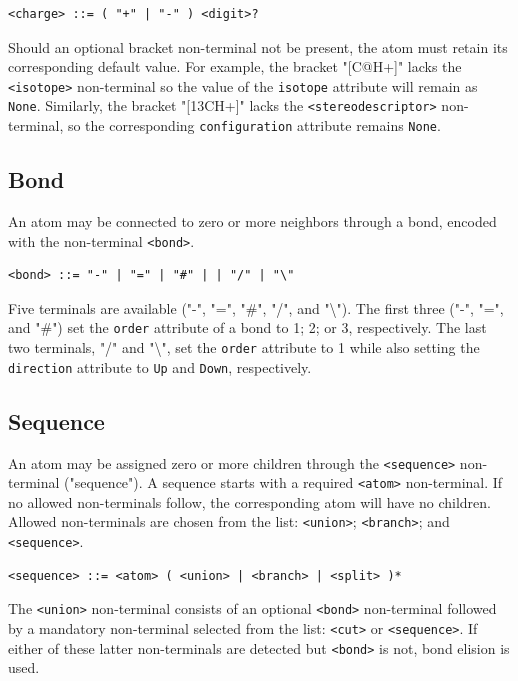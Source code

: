 \documentclass{article}
\def\ttt{\texttt}
\begin{document}
\begin{lstlisting}
<charge> ::= ( "+" | "-" ) <digit>?
\end{lstlisting}

Should an optional bracket non-terminal not be present, the atom must retain its corresponding default value. For example, the bracket "[C@H+]" lacks the \ttt{<isotope>} non-terminal so the value of the \ttt{isotope} attribute will remain as \ttt{None}. Similarly, the bracket "[13CH+]" lacks the \ttt{<stereodescriptor>} non-terminal, so the corresponding \ttt{configuration} attribute remains \ttt{None}.

\subsection*{Bond}

An atom may be connected to zero or more neighbors through a bond, encoded with the non-terminal \ttt{<bond>}.

\begin{lstlisting}
<bond> ::= "-" | "=" | "#" | | "/" | "\"
\end{lstlisting}

Five terminals are available ("-", "=", "\#", "/", and "\textbackslash"). The first three ("-", "=", and "\#") set the \ttt{order} attribute of a bond to 1; 2; or 3, respectively. The last two terminals, "/" and "\textbackslash", set the \ttt{order} attribute to 1 while also setting the \ttt{direction} attribute to \ttt{Up} and \ttt{Down}, respectively.

\subsection*{Sequence}

An atom may be assigned zero or more children through the \ttt{<sequence>} non-terminal ("sequence"). A sequence starts with a required \ttt{<atom>} non-terminal. If no allowed non-terminals follow, the corresponding atom will have no children. Allowed non-terminals are chosen from the list: \ttt{<union>}; \ttt{<branch>}; and \ttt{<sequence>}.

\begin{lstlisting}
<sequence> ::= <atom> ( <union> | <branch> | <split> )*
\end{lstlisting}

The \ttt{<union>} non-terminal consists of an optional \ttt{<bond>} non-terminal followed by a mandatory non-terminal selected from the list: \ttt{<cut>} or \ttt{<sequence>}. If either of these latter non-terminals are detected but \ttt{<bond>} is not, bond elision is used.
\end{document}
